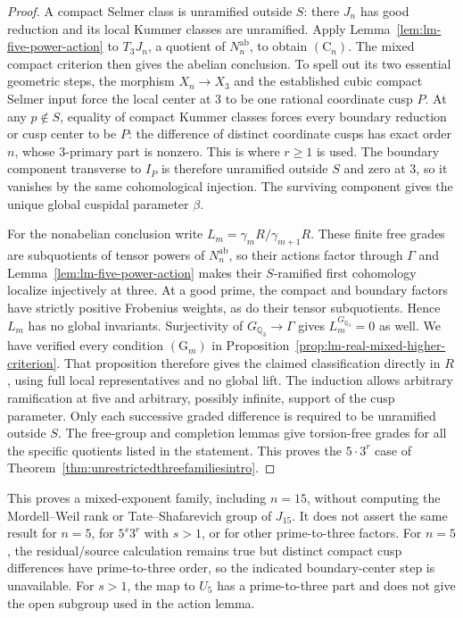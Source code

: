 \begin{proof}
A compact Selmer class is unramified outside $S$:
there $J_n$ has good reduction and its local Kummer
classes are unramified.  Apply
Lemma~\ref{lem:lm-five-power-action} to $T_3J_n$, a
quotient of $N_n^{\mathrm{ab}}$, to obtain $(\mathrm C_n)$.
The mixed compact criterion then gives the abelian
conclusion.  To spell out its two essential geometric
steps, the morphism $X_n\to X_3$ and the established
cubic compact Selmer input force the local center at
$3$ to be one rational coordinate cusp $P$.
At any $p\notin S$, equality of compact Kummer classes
forces every boundary reduction or cusp center to be
$P$: the difference of distinct coordinate cusps has
exact order $n$, whose $3$-primary part is nonzero.
This is where $r\ge1$ is used.
The boundary component transverse to $I_P$ is therefore
unramified outside $S$ and zero at $3$, so it vanishes
by the same cohomological injection.
The surviving component gives the unique global
cuspidal parameter $\beta$.

For the nonabelian conclusion write
$L_m=\gamma_mR/\gamma_{m+1}R$.
These finite free grades are subquotients of tensor powers of
$N_n^{\mathrm{ab}}$, so their actions factor through $\Gamma$ and
Lemma~\ref{lem:lm-five-power-action} makes their $S$-ramified first
cohomology localize injectively at three. At a good prime, the
compact and boundary factors have strictly positive Frobenius weights,
as do their tensor subquotients. Hence $L_m$ has no global invariants.
Surjectivity of $G_{\mathbb Q_3}\to\Gamma$ gives
$L_m^{G_{\mathbb Q_3}}=0$ as well. We have verified every condition
$(\mathrm G_m)$ in Proposition~\ref{prop:lm-real-mixed-higher-criterion}.
That proposition therefore gives the claimed classification directly
in $R$, using full local representatives and no global lift.
The induction allows arbitrary ramification at five and arbitrary,
possibly infinite, support of the cusp parameter. Only each successive
graded difference is required to be unramified outside $S$.
The free-group and completion lemmas give torsion-free grades for
all the specific quotients listed in the statement.
This proves the $5\cdot3^r$ case of
Theorem~\ref{thm:unrestrictedthreefamiliesintro}.
\end{proof}

\begin{remark}[Scope]\label{rem:lm-five-power-scope}
This proves a mixed-exponent family, including $n=15$,
without computing the Mordell--Weil rank or Tate--Shafarevich
group of $J_{15}$.  It does not assert the same result
for $n=5$, for $5^s3^r$ with $s>1$, or for other
prime-to-three factors.  For $n=5$, the residual/source
calculation remains true but distinct compact cusp
differences have prime-to-three order, so the indicated
boundary-center step is unavailable.  For $s>1$, the
map to $U_5$ has a prime-to-three part and does not
give the open subgroup used in the action lemma.
\end{remark}

